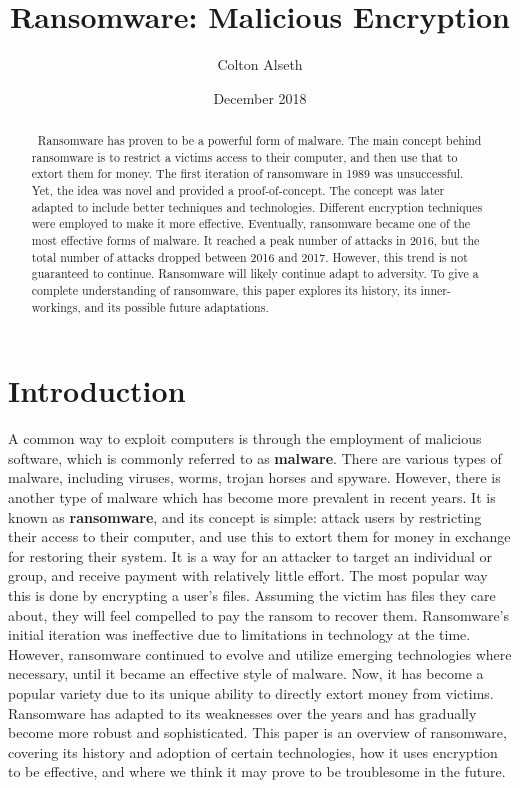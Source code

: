 \documentclass{IEEEtran}
\title{Ransomware: Malicious Encryption}
\author{Colton Alseth}
\date{December 2018}
\begin{document}
\pagestyle{plain}


\maketitle
\begin{abstract}
    ~Ransomware has proven to be a powerful form of malware. The main concept behind ransomware is to restrict a victims access to their computer, and then use that to extort them for money. The first iteration of ransomware in 1989 was unsuccessful. Yet, the idea was novel and provided a proof-of-concept. The concept was later adapted to include better techniques and technologies. Different encryption techniques were employed to make it more effective. Eventually, ransomware became one of the most effective forms of malware. It reached a peak number of attacks in 2016, but the total number of attacks dropped between 2016 and 2017. However, this trend is not guaranteed to continue. Ransomware will likely continue adapt to adversity. To give a complete understanding of ransomware, this paper explores its history, its inner-workings, and its possible future adaptations.
\end{abstract}

\tableofcontents

\listoffigures

\section{Introduction}

A common way to exploit computers is through the employment of malicious software, which is commonly referred to as \textbf{malware}. There are various types of malware, including viruses, worms, trojan horses and spyware. However, there is another type of malware which has become more prevalent in recent years. It is known as \textbf{ransomware}, and its concept is simple: attack users by restricting their access to their computer, and use this to extort them for money in exchange for restoring their system. It is a way for an attacker to target an individual or group, and receive payment with relatively little effort. The most popular way this is done by encrypting a user's files. Assuming the victim has files they care about, they will feel compelled to pay the ransom to recover them. Ransomware's initial iteration was ineffective due to limitations in technology at the time. However, ransomware continued to evolve and utilize emerging technologies where necessary, until it became an effective style of malware. Now, it has become a popular variety due to its unique ability to directly extort money from victims. Ransomware has adapted to its weaknesses over the years and has gradually become more robust and sophisticated. This paper is an overview of ransomware, covering its history and adoption of certain technologies, how it uses encryption to be effective, and where we think it may prove to be troublesome in the future.
\end{document}
